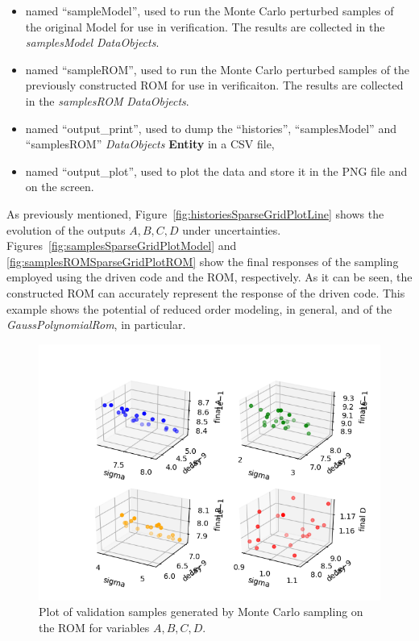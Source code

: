 \begin{enumerate}
\begin{itemize}
     \item {} named ``sampleModel'', used to run the
     Monte Carlo perturbed samples of the original Model for use in verification.  The results are
     collected in the \textit{samplesModel} \textit{DataObjects}.
     \item {} named ``sampleROM'', used to run the
     Monte Carlo perturbed samples of the previously constructed ROM for use in verificaiton.  The results are
     collected in the \textit{samplesROM} \textit{DataObjects}.
     \item  {} named ``output\_print'', used to dump
     the ``histories'', ``samplesModel'' and ``samplesROM'' \textit{DataObjects}
     \textbf{Entity} in a CSV file,
     \item  {} named ``output\_plot'', used to
     plot the data and store it in the PNG file and
     on the screen.
   \end{itemize}
\end{enumerate}
 As previously mentioned, Figure~\ref{fig:historiesSparseGridPlotLine}
 shows the evolution of the outputs $A,B,C,D$ under uncertainties.
 Figures~\ref{fig:samplesSparseGridPlotModel} and
 \ref{fig:samplesROMSparseGridPlotROM} show the final responses
 of the sampling employed using the driven code and the ROM,
 respectively. As it can be seen, the constructed ROM can accurately
 represent the response of the driven code. This example shows the
 potential of reduced order modeling, in general, and of the
 \textit{GaussPolynomialRom}, in particular.

 \begin{figure}[h!]
  \centering
  \includegraphics[scale=0.7]{../../tests/framework/user_guide/ForwardSamplingStrategies/gold/RunDir/SparseGrid/1-samplesROMPlot3D_scatter-scatter-scatter-scatter.png}
  \caption{Plot of validation samples generated by Monte Carlo sampling on the ROM for variables $A,B,C,D$.}
  \label{fig:samplesROMSparseGridPlot}
 \end{figure}








